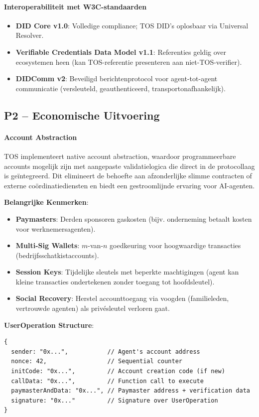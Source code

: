\documentclass[11pt]{article}
\begin{document}
\paragraph{Interoperabiliteit met W3C-standaarden}
\begin{itemize}[noitemsep]
  \item \textbf{DID Core v1.0}: Volledige compliance; TOS DID's oplosbaar via Universal Resolver.
  \item \textbf{Verifiable Credentials Data Model v1.1}: Referenties geldig over ecosystemen heen (kan TOS-referentie presenteren aan niet-TOS-verifier).
  \item \textbf{DIDComm v2}: Beveiligd berichtenprotocol voor agent-tot-agent communicatie (versleuteld, geauthenticeerd, transportonafhankelijk).
\end{itemize}

\subsection{P2 -- Economische Uitvoering}
\label{sec:pillar-economic}

\paragraph{Account Abstraction}
TOS implementeert native account abstraction, waardoor programmeerbare accounts mogelijk zijn met aangepaste validatielogica die direct in de protocollaag is geïntegreerd. Dit elimineert de behoefte aan afzonderlijke slimme contracten of externe coördinatiediensten en biedt een gestroomlijnde ervaring voor AI-agenten.

\textbf{Belangrijke Kenmerken}:
\begin{itemize}[noitemsep]
  \item \textbf{Paymasters}: Derden sponsoren gaskosten (bijv. onderneming betaalt kosten voor werknemersagenten).
  \item \textbf{Multi-Sig Wallets}: $m$-van-$n$ goedkeuring voor hoogwaardige transacties (bedrijfsschatkistaccounts).
  \item \textbf{Session Keys}: Tijdelijke sleutels met beperkte machtigingen (agent kan kleine transacties ondertekenen zonder toegang tot hoofdsleutel).
  \item \textbf{Social Recovery}: Herstel accounttoegang via voogden (familieleden, vertrouwde agenten) als privésleutel verloren gaat.
\end{itemize}

\textbf{UserOperation Structure}:
\begin{verbatim}
{
  sender: "0x...",           // Agent's account address
  nonce: 42,                 // Sequential counter
  initCode: "0x...",         // Account creation code (if new)
  callData: "0x...",         // Function call to execute
  paymasterAndData: "0x...", // Paymaster address + verification data
  signature: "0x..."         // Signature over UserOperation
}
\end{verbatim}
\end{document}
